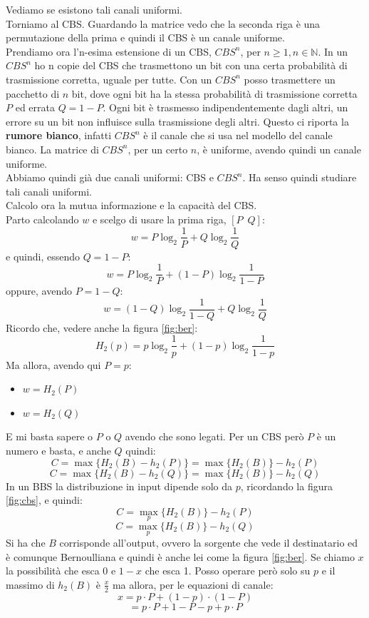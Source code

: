 \documentclass[a4paper,12pt, oneside]{book}
\begin{document}
Vediamo se esistono tali canali uniformi.\\
Torniamo al CBS. Guardando la matrice vedo che la seconda riga è una
permutazione della prima e quindi il CBS è un canale uniforme.\\
Prendiamo ora l'n-esima estensione di un CBS, $CBS^n$, per $n\geq 1,
n\in\mathbb{N}$. In un $CBS^n$ ho n copie del CBS che trasmettono un bit con una
certa probabilità di trasmissione corretta, uguale per tutte. Con un $CBS^n$
posso trasmettere un pacchetto di $n$ bit, dove ogni bit ha la stessa
probabilità di trasmissione corretta $P$ ed errata $Q=1-P$. Ogni bit è
trasmesso indipendentemente dagli altri, un errore su un bit non influisce sulla
trasmissione degli altri. Questo ci riporta la \textbf{rumore bianco}, infatti
$CBS^n$ è il canale che si usa nel modello del canale bianco. La matrice di
$CBS^n$, per un certo $n$, è uniforme, avendo quindi un canale uniforme.\\
Abbiamo quindi già due canali uniformi: CBS e $CBS^n$. Ha senso quindi studiare
tali canali uniformi.\\
Calcolo ora la mutua informazione e la capacità del CBS.\\
Parto calcolando $w$ e scelgo di usare la prima riga, $[P\,\,\,Q]$:
\[w=P\log_2\frac{1}{P}+Q\log_2\frac{1}{Q}\]
e quindi, essendo $Q=1-P$:
\[w=P\log_2\frac{1}{P}+(1-P)\log_2\frac{1}{1-P}\]
oppure, avendo $P=1-Q$:
\[w=(1-Q)\log_2\frac{1}{1-Q}+Q\log_2\frac{1}{Q}\]
Ricordo che, vedere anche la figura \ref{fig:ber}:
\[H_2(p)=p\log_2\frac{1}{p}+(1-p)\log_2\frac{1}{1-p}\]
Ma allora, avendo qui $P=p$:
\begin{itemize}
  \item $w=H_2(P)$
  \item $w=H_2(Q)$
\end{itemize}
E mi basta sapere o $P$ o $Q$ avendo che sono legati. Per un CBS però $P$ è un
numero e basta, e anche $Q$ quindi:
\[C=\max \{H_2(B)-h_2(P)\}=\max \{H_2(B)\}-h_2(P)\]
\[C=\max \{H_2(B)-h_2(Q)\}=\max \{H_2(B)\}-h_2(Q)\]
In un BBS la distribuzione in input dipende solo da $p$, ricordando la figura
\ref{fig:cbs}, e quindi: 
\[C=\max_p \{H_2(B)\}-h_2(P)\]
\[C=\max_p \{H_2(B)\}-h_2(Q)\]
Si ha che $B$ corrisponde all'output, ovvero la sorgente che vede il
destinatario ed è comunque Bernoulliana e quindi è anche lei come la figura
\ref{fig:ber}. Se chiamo $x$ la possibilità che esca 0 e $1-x$ che esca 1. Posso
operare però solo su $p$ e il massimo di $h_2(B)$ è $\frac{x}{2}$ ma allora, per
le equazioni di canale:
\[x=p\cdot P+(1-p)\cdot (1-P)\]
\[=p\cdot P+1-P-p+p\cdot P\]
\end{document}
